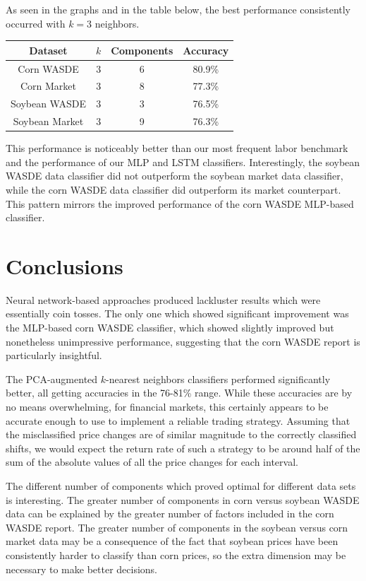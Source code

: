 \documentclass{article}
\begin{document}
As seen in the graphs and in the table below, the best performance consistently occurred with $k=3$ neighbors.  

\begin{center}
\begin{tabular}{|c|c|c|c|}
\hline
Dataset & $k$ & Components & Accuracy\\
\hline
Corn WASDE & 3 & 6 & 80.9\%\\
Corn Market & 3 & 8 & 77.3\%\\
Soybean WASDE & 3 & 3 & 76.5\%\\
Soybean Market & 3 & 9 & 76.3\%\\
\hline
\end{tabular}
\end{center}

This performance is noticeably better than our most frequent labor benchmark and the performance of our MLP and LSTM classifiers.  
Interestingly, the soybean WASDE data classifier did not outperform the soybean market data classifier, while the corn WASDE data classifier did outperform its market counterpart.  This pattern mirrors the improved performance of the corn WASDE MLP-based classifier.  


\section{Conclusions}
Neural network-based approaches produced lackluster results which were essentially coin tosses.  
The only one which showed significant improvement was the MLP-based corn WASDE classifier, which showed slightly improved but nonetheless unimpressive performance, suggesting that the corn WASDE report is particularly insightful.  

The PCA-augmented $k$-nearest neighbors classifiers performed significantly better, all getting accuracies in the 76-81\% range.  While these accuracies are by no means overwhelming, for financial markets, this certainly appears to be accurate enough to use to implement a reliable trading strategy.  Assuming that the misclassified price changes are of similar magnitude to the correctly classified shifts, we would expect the return rate of such a strategy to be around half of the sum of the absolute values of all the price changes for each interval.  

The different number of components which proved optimal for different data sets is interesting.  The greater number of components in corn versus soybean WASDE data can be explained by the greater number of factors included in the corn WASDE report.  The greater number of components in the soybean versus corn market data may be a consequence of the fact that soybean prices have been consistently harder to classify than corn prices, so the extra dimension may be necessary to make better decisions.
\end{document}
